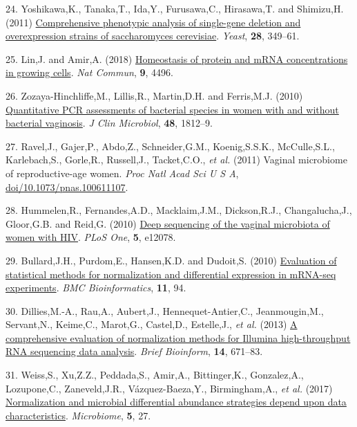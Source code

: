 \documentclass[
]{article}
\newlength{\cslhangindent}
\newenvironment{CSLReferences}[2] %
 {\begin{list}{}{%
  \setlength{\itemindent}{0pt}
  \setlength{\leftmargin}{0pt}
  \setlength{\parsep}{0pt}
  \ifodd #1
   \setlength{\leftmargin}{\cslhangindent}
   \setlength{\itemindent}{-1\cslhangindent}
  \fi
  \setlength{\itemsep}{#2\baselineskip}}}
 {\end{list}}
\begin{document}
\begin{CSLReferences}{1}{1}
24. Yoshikawa,K., Tanaka,T., Ida,Y., Furusawa,C., Hirasawa,T. and
Shimizu,H. (2011) \href{https://doi.org/10.1002/yea.1843}{Comprehensive
phenotypic analysis of single-gene deletion and overexpression strains
of saccharomyces cerevisiae}. \emph{Yeast}, \textbf{28}, 349--61.

25. Lin,J. and Amir,A. (2018)
\href{https://doi.org/10.1038/s41467-018-06714-z}{Homeostasis of protein
and mRNA concentrations in growing cells}. \emph{Nat Commun},
\textbf{9}, 4496.

26. Zozaya-Hinchliffe,M., Lillis,R., Martin,D.H. and Ferris,M.J. (2010)
\href{https://doi.org/10.1128/JCM.00851-09}{Quantitative PCR assessments
of bacterial species in women with and without bacterial vaginosis}.
\emph{J Clin Microbiol}, \textbf{48}, 1812--9.

27. Ravel,J., Gajer,P., Abdo,Z., Schneider,G.M., Koenig,S.S.K.,
McCulle,S.L., Karlebach,S., Gorle,R., Russell,J., Tacket,C.O., \emph{et
al.} (2011) Vaginal microbiome of reproductive-age women. \emph{Proc
Natl Acad Sci U S A},
\href{https://doi.org/doi/10.1073/pnas.100611107}{doi/10.1073/pnas.100611107}.

28. Hummelen,R., Fernandes,A.D., Macklaim,J.M., Dickson,R.J.,
Changalucha,J., Gloor,G.B. and Reid,G. (2010)
\href{https://doi.org/10.1371/journal.pone.0012078}{Deep sequencing of
the vaginal microbiota of women with {HIV}}. \emph{PLoS One},
\textbf{5}, e12078.

29. Bullard,J.H., Purdom,E., Hansen,K.D. and Dudoit,S. (2010)
\href{https://doi.org/10.1186/1471-2105-11-94}{Evaluation of statistical
methods for normalization and differential expression in m{RNA-seq}
experiments}. \emph{BMC Bioinformatics}, \textbf{11}, 94.

30. Dillies,M.-A., Rau,A., Aubert,J., Hennequet-Antier,C.,
Jeanmougin,M., Servant,N., Keime,C., Marot,G., Castel,D., Estelle,J.,
\emph{et al.} (2013) \href{https://doi.org/10.1093/bib/bbs046}{A
comprehensive evaluation of normalization methods for {Illumina}
high-throughput {RNA} sequencing data analysis}. \emph{Brief Bioinform},
\textbf{14}, 671--83.

31. Weiss,S., Xu,Z.Z., Peddada,S., Amir,A., Bittinger,K., Gonzalez,A.,
Lozupone,C., Zaneveld,J.R., Vázquez-Baeza,Y., Birmingham,A., \emph{et
al.} (2017)
\href{https://doi.org/10.1186/s40168-017-0237-y}{Normalization and
microbial differential abundance strategies depend upon data
characteristics}. \emph{Microbiome}, \textbf{5}, 27.


\end{CSLReferences}
\end{document}
